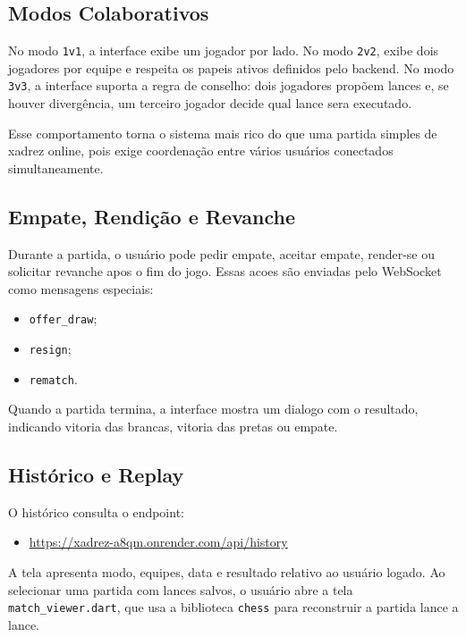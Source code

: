 \documentclass[12pt]{article}
\begin{document}
\subsection{Modos Colaborativos}

No modo \texttt{1v1}, a interface exibe um jogador por lado. No modo \texttt{2v2}, exibe dois jogadores por equipe e respeita os papeis ativos definidos pelo backend. No modo \texttt{3v3}, a interface suporta a regra de conselho: dois jogadores propõem lances e, se houver divergência, um terceiro jogador decide qual lance sera executado.

Esse comportamento torna o sistema mais rico do que uma partida simples de xadrez online, pois exige coordenação entre vários usuários conectados simultaneamente.

\subsection{Empate, Rendição e Revanche}

Durante a partida, o usuário pode pedir empate, aceitar empate, render-se ou solicitar revanche apos o fim do jogo. Essas acoes são enviadas pelo WebSocket como mensagens especiais:

\begin{itemize}
    \item \texttt{offer\_draw};
    \item \texttt{resign};
    \item \texttt{rematch}.
\end{itemize}

Quando a partida termina, a interface mostra um dialogo com o resultado, indicando vitoria das brancas, vitoria das pretas ou empate.

\subsection{Histórico e Replay}

O histórico consulta o endpoint:

\begin{itemize}
    \item \url{https://xadrez-a8qm.onrender.com/api/history}
\end{itemize}

A tela apresenta modo, equipes, data e resultado relativo ao usuário logado. Ao selecionar uma partida com lances salvos, o usuário abre a tela \texttt{match\_viewer.dart}, que usa a biblioteca \texttt{chess} para reconstruir a partida lance a lance.
\end{document}
